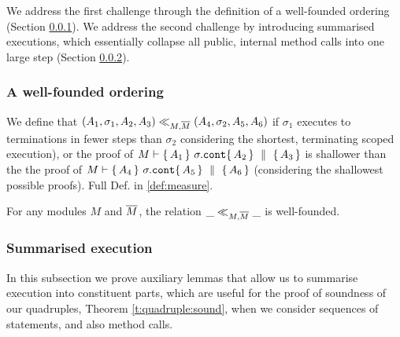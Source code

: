 We address the first challenge  through the definition of a well-founded ordering (\cf Section \ref{sect:prove:wellfounded}). 
We address the second challenge by introducing summarised executions, which essentially collapse all public, internal method calls into one large step (\cf Section \ref{sect:termExecs}).

\subsubsection{A well-founded ordering}
\label{sect:prove:wellfounded}

We define that $(A_1,\sigma_1,A_2, A_3) \ll_{M,\overline{M}}  (A_4,\sigma_2,A_5, A_6)$ if $\sigma_1$ executes to terminations in fewer steps than $\sigma_2$ considering the shortest, terminating scoped execution), or  the proof of $M \vdash  \{\, A_1 \, \}\ \sigma.\mbox{\normalfont{\texttt{cont}}} \{\, A_2 \, \} \, \,\parallel\,\, \{\, A_3 \, \}  $
is shallower than the the proof of  $M \vdash  \{\, A_4 \, \}\ \sigma.\mbox{\normalfont{\texttt{cont}}} \{\, A_5 \, \} \, \,\parallel\,\, \{\, A_6 \, \}  $ (considering the shallowest possible proofs). Full Def. in \ref{def:measure}.

 

 


\begin{auxLemma}
\label{lemma:normal:two}
For any modules $M$ and $\overline{M}$,  the relation $\_ \ll_{M,\overline{M}}  \_$ is well-founded.
\end{auxLemma}

\subsubsection{Summarised  execution} 
\label{sect:termExecs}

In this subsection we prove auxiliary lemmas that allow us to summarise execution into  constituent parts, which are useful for the proof of soundness of our quadruples, Theorem \ref{t:quadruple:sound}, when we consider sequences of statements, and also method calls.

 


\label{sect:termExecs}

